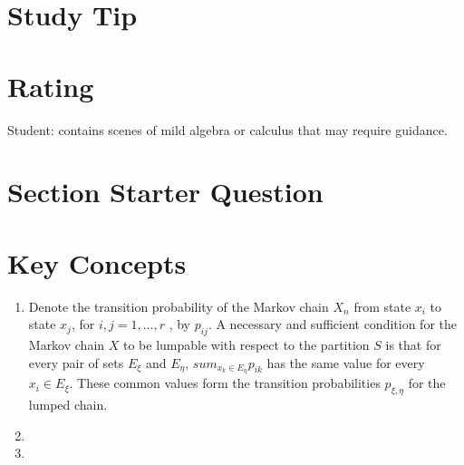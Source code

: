 \documentclass[12pt]{article}
\begin{document}
\myheader
\mytitle

\hr

\sectiontitle{}

\hr

\usefirefox

\hr

\section*{Study Tip}

\hr

\section*{Rating} %
Student: contains scenes of mild algebra or calculus that may require guidance.

\hr

\section*{Section Starter Question}

\hr

\section*{Key Concepts}

\begin{enumerate}
  \item Denote the transition probability
of the Markov chain $X_n$ from state $x_i$ to state $x_j$, for \( i, j
= 1, \dots,  r\) , by \( p_{ij} \).  A 
necessary and sufficient condition for the Markov chain $X$ to be lumpable
with respect to the partition $S$ is that for every pair of sets
$E_{\xi}$ and $E_{\eta}$, \( sum_{x_k \in E_{\eta}} p_{ik} \) has the
same value for every \(x_i \in E_{\xi} \). These common values form
the transition probabilities $p_{\xi, \eta}$ for the lumped chain.

  \item 
  \item 
\end{enumerate}
\end{document}
